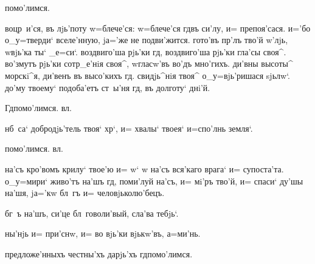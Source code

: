   помо'лимся.


 воцр~и'ся, въ лjь'поту w=блече'ся: w=блече'ся 
гд въ си'лу, и= препоя'сася. и='бо о_у=тверди` 
вселе'нную, jа='же не подви'жится. гото'въ пр'лъ 
тво'й w'лjь, w\т вjь'ка ты` _е=си`. воздвиго'ша 
рjь'ки гд, воздвиго'ша рjь'ки гла'сы своя^. во'змутъ 
рjь'ки сотр_е'нiя своя^, w\т гласw'въ во'дъ мно'гихъ. 
ди'вны высоты^ морскi^я, ди'венъ въ высо'кихъ гд. 
свидjь^нiя твоя^ о_у=вjь'ришася sjьлw`. до'му твоему` 
подоба'етъ ст~ы'ня гд, въ долготу` днi'й.

 Гд помо'лимся.  вл.

          нб~са` добродjь'тель 
твоя` хр`, и= хвалы` твоея` и=спо'лнь земля`.

  помо'лимся.  вл.


 на'съ кро'вомъ крилу` твое'ю и= w` w\т 
на'съ вся'каго врага` и= супоста'та. о_у=мири` живо'тъ 
на'шъ гд, поми'луй на'съ, и= мi'ръ тво'й, и= спаси` 
ду'шы на'шя, jа='кw бл~гъ и= человjьколю'бецъ.


 бг~ъ на'шъ, си'це бл~говоли'вый, сла'ва 
тебjь`.


 ны'нjь и= при'снw, и= во вjь'ки вjькw'въ, 
а=ми'нь. 


 предложе'нныхъ честны'хъ дарjь'хъ гд помо'лимся.



